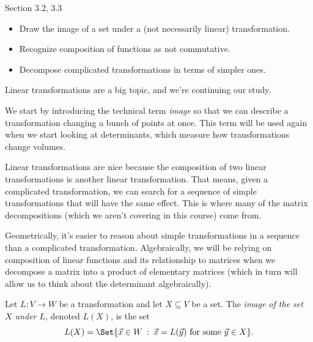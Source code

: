 \documentclass{problemset}
\providecommand\given{}
\newcommand\SetSymbol[1][]{%
	\nonscript\::%
	\allowbreak
	\nonscript\:
	\mathopen{}}
\renewcommand\given{\SetSymbol[\delimsize]}
\begin{document}
\begin{lesson}

	Section 3.2, 3.3

	\begin{itemize}
		\item Draw the image of a set under a (not necessarily linear) transformation.
		\item Recognize composition of functions as not commutative.
		\item Decompose complicated transformations in terms of simpler ones.
	\end{itemize}

		Linear transformations are a big topic, and we're continuing our study.

		We start by introducing the technical term \emph{image} so that we can describe
		a transformation changing a bunch of points at once. This term will be used again when
		we start looking at determinants, which measure how transformations change volumes.

		Linear transformations are nice because the composition of two linear transformations
		is another linear transformation. That means, given a complicated transformation, we can
		search for a sequence of simple transformations that will have the same effect. This is
		where many of the matrix decompositions (which we aren't covering in this course) come from.

		Geometrically, it's easier to reason about simple transformations in a sequence than a complicated
		transformation. Algebraically, we will be relying on composition of linear functions and its relationship
		to matrices when we decompose a matrix into a product of elementary matrices (which in turn will
		allow us to think about the determinant algebraically).

\end{lesson}
	\begin{definition}
		Let $L:V\to W$ be a transformation and let $X\subseteq V$ be a set.
		The \emph{image of the set $X$ under $L$}, denoted $L(X)$, is the set
		\[
			L(X)=\Set{\vec x\in W \given \vec x=L(\vec y)\text{ for some }\vec y\in X}.
		\]
	\end{definition}
\end{document}
